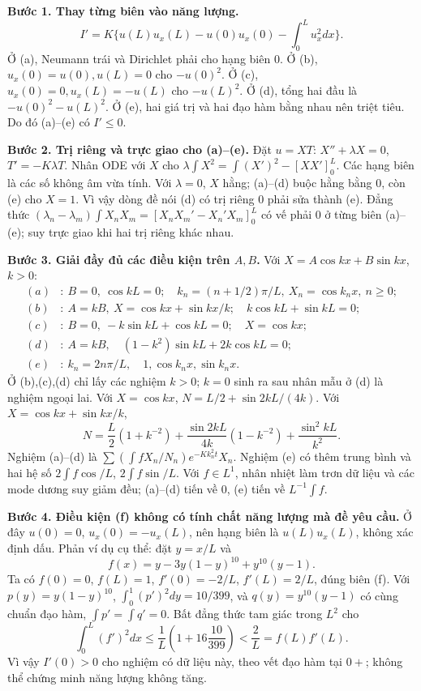 \textbf{Bước 1. Thay từng biên vào năng lượng.}
\[I'=K\{u(L)u_x(L)-u(0)u_x(0)-\int_0^Lu_x^2dx\}.\]
Ở (a), Neumann trái và Dirichlet phải cho hạng biên $0$. Ở (b), $u_x(0)=u(0),u(L)=0$ cho $-u(0)^2$. Ở (c), $u_x(0)=0,u_x(L)=-u(L)$ cho $-u(L)^2$. Ở (d), tổng hai đầu là $-u(0)^2-u(L)^2$. Ở (e), hai giá trị và hai đạo hàm bằng nhau nên triệt tiêu. Do đó (a)--(e) có $I'\le0$.

\textbf{Bước 2. Trị riêng và trực giao cho (a)--(e).}
Đặt $u=XT$: $X''+\lambda X=0$, $T'=-K\lambda T$. Nhân ODE với $X$ cho $\lambda\int X^2=\int(X')^2-[XX']_0^L$. Các hạng biên là các số không âm vừa tính. Với $\lambda=0$, $X$ hằng; (a)--(d) buộc hằng bằng $0$, còn (e) cho $X=1$. Vì vậy dòng đề nói (d) có trị riêng $0$ phải sửa thành (e). Đẳng thức $(\lambda_n-\lambda_m)\int X_nX_m=[X_nX_m'-X_n'X_m]_0^L$ có vế phải $0$ ở từng biên (a)--(e); suy trực giao khi hai trị riêng khác nhau.

\textbf{Bước 3. Giải đầy đủ các điều kiện trên $A,B$.}
Với $X=A\cos kx+B\sin kx$, $k>0$:
\begin{align*}
(a)&:\ B=0,\ \cos kL=0;\quad k_n=(n+1/2)\pi/L,\ X_n=\cos k_nx,\ n\ge0;\\
(b)&:\ A=kB,\ X=\cos kx+\sin kx/k;\quad k\cos kL+\sin kL=0;\\
(c)&:\ B=0,\ -k\sin kL+\cos kL=0;\quad X=\cos kx;\\
(d)&:\ A=kB,\quad (1-k^2)\sin kL+2k\cos kL=0;\\
(e)&:\ k_n=2n\pi/L,\quad 1,\cos k_nx,\sin k_nx.
\end{align*}
Ở (b),(c),(d) chỉ lấy các nghiệm $k>0$; $k=0$ sinh ra sau nhân mẫu ở (d) là nghiệm ngoại lai. Với $X=\cos kx$, $N=L/2+\sin2kL/(4k)$. Với $X=\cos kx+\sin kx/k$,
\[N=\frac L2(1+k^{-2})+\frac{\sin2kL}{4k}(1-k^{-2})+\frac{\sin^2kL}{k^2}.\]
Nghiệm (a)--(d) là $\sum (\int fX_n/N_n)e^{-Kk_n^2t}X_n$. Nghiệm (e) có thêm trung bình và hai hệ số $2\int f\cos/L$, $2\int f\sin/L$. Với $f\in L^1$, nhân nhiệt làm trơn dữ liệu và các mode dương suy giảm đều; (a)--(d) tiến về $0$, (e) tiến về $L^{-1}\int f$.

\textbf{Bước 4. Điều kiện (f) không có tính chất năng lượng mà đề yêu cầu.}
Ở đây $u(0)=0$, $u_x(0)=-u_x(L)$, nên hạng biên là $u(L)u_x(L)$, không xác định dấu. Phản ví dụ cụ thể: đặt $y=x/L$ và
\[f(x)=y-3y(1-y)^{10}+y^{10}(y-1).\]
Ta có $f(0)=0$, $f(L)=1$, $f'(0)=-2/L$, $f'(L)=2/L$, đúng biên (f). Với $p(y)=y(1-y)^{10}$, $\int_0^1(p')^2dy=10/399$, và $q(y)=y^{10}(y-1)$ có cùng chuẩn đạo hàm, $\int p'=\int q'=0$. Bất đẳng thức tam giác trong $L^2$ cho
\[\int_0^L(f')^2dx\le\frac1L\left(1+16\frac{10}{399}\right)<\frac2L=f(L)f'(L).\]
Vì vậy $I'(0)>0$ cho nghiệm có dữ liệu này, theo vết đạo hàm tại $0+$; không thể chứng minh năng lượng không tăng.

